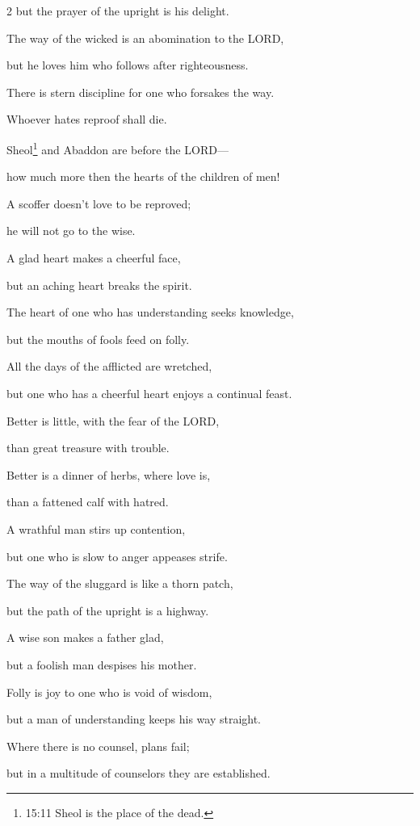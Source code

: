 \begin{multicols}{2}
but the prayer of the upright is his delight.


\myverse{}The way of the wicked is an abomination to the LORD,

but he loves him who follows after righteousness.


\myverse{}There is stern discipline for one who forsakes the way.

Whoever hates reproof shall die.


\myverse{}Sheol\footnote{15:11 Sheol is the place of the dead.} and Abaddon are before the LORD—

how much more then the hearts of the children of men!


\myverse{}A scoffer doesn’t love to be reproved;

he will not go to the wise.


\myverse{}A glad heart makes a cheerful face,

but an aching heart breaks the spirit.


\myverse{}The heart of one who has understanding seeks knowledge,

but the mouths of fools feed on folly.


\myverse{}All the days of the afflicted are wretched,

but one who has a cheerful heart enjoys a continual feast.


\myverse{}Better is little, with the fear of the LORD,

than great treasure with trouble.


\myverse{}Better is a dinner of herbs, where love is,

than a fattened calf with hatred.


\myverse{}A wrathful man stirs up contention,

but one who is slow to anger appeases strife.


\myverse{}The way of the sluggard is like a thorn patch,

but the path of the upright is a highway.


\myverse{}A wise son makes a father glad,

but a foolish man despises his mother.


\myverse{}Folly is joy to one who is void of wisdom,

but a man of understanding keeps his way straight.


\myverse{}Where there is no counsel, plans fail;

but in a multitude of counselors they are established.



\end{multicols}
